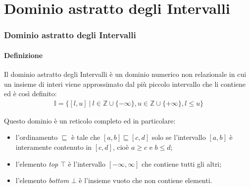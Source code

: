 \documentclass{beamer}
\begin{document}
\section{Dominio astratto degli Intervalli}
	\begin{frame}
		\frametitle{Dominio astratto degli Intervalli}
		\framesubtitle{Definizione}
		Il \alert{dominio astratto degli Intervalli} è un dominio numerico non relazionale in cui un insieme di interi viene approssimato dal più piccolo intervallo che li contiene ed è così definito:
		\begin{align*}
		\mathbb{I} = \{ [l, u] ~|~ l\in \mathbb{Z} \cup \{ -\infty \}, u\in \mathbb{Z} \cup \{ + \infty \}, l\leq u \}
		\end{align*}
		
		Questo dominio è un \alert{reticolo} completo ed in particolare:
		\begin{itemize}
			\item l'ordinamento $\sqsubseteq$ è tale che $[a, b] \sqsubseteq [c, d]$ solo se l'intervallo $[a, b]$ è interamente contenuto in $[c, d]$, cioè $a\geq c$ e $b\leq d$;
			\item l'elemento \textit{top} $\top$ è l'intervallo $[-\infty, \infty]$ che contiene tutti gli altri;
			\item l'elemento \textit{bottom} $\bot$ è l'insieme vuoto che non contiene elementi. 
		\end{itemize}
	

	
	

	\end{frame}
\end{document}
